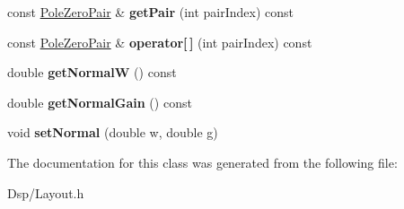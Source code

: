 \begin{DoxyCompactItemize}
\item 
\hypertarget{classDsp_1_1LayoutBase_a61296054eadd6901bce04d99f1271f24}{const \hyperlink{structDsp_1_1PoleZeroPair}{Pole\-Zero\-Pair} \& {\bfseries get\-Pair} (int pair\-Index) const }\label{classDsp_1_1LayoutBase_a61296054eadd6901bce04d99f1271f24}

\item 
\hypertarget{classDsp_1_1LayoutBase_aede125a5384ddcef5fe31d3c2ceffad1}{const \hyperlink{structDsp_1_1PoleZeroPair}{Pole\-Zero\-Pair} \& {\bfseries operator\mbox{[}$\,$\mbox{]}} (int pair\-Index) const }\label{classDsp_1_1LayoutBase_aede125a5384ddcef5fe31d3c2ceffad1}

\item 
\hypertarget{classDsp_1_1LayoutBase_a7922c96ddd85ce1144d7fd47359de044}{double {\bfseries get\-Normal\-W} () const }\label{classDsp_1_1LayoutBase_a7922c96ddd85ce1144d7fd47359de044}

\item 
\hypertarget{classDsp_1_1LayoutBase_a5335a55dd6cc4b4ea13068e62c3a92c5}{double {\bfseries get\-Normal\-Gain} () const }\label{classDsp_1_1LayoutBase_a5335a55dd6cc4b4ea13068e62c3a92c5}

\item 
\hypertarget{classDsp_1_1LayoutBase_ac3c1adfb68fdbd4ea2e7a5283ea0118e}{void {\bfseries set\-Normal} (double w, double g)}\label{classDsp_1_1LayoutBase_ac3c1adfb68fdbd4ea2e7a5283ea0118e}

\end{DoxyCompactItemize}


The documentation for this class was generated from the following file\-:\begin{DoxyCompactItemize}
\item 
Dsp/Layout.\-h\end{DoxyCompactItemize}
